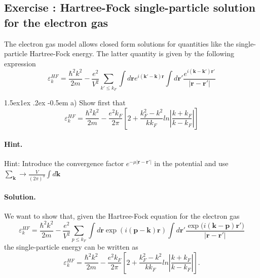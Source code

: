 \documentclass[%
oneside,                 %
final,                   %
10pt]{article}
\makeatletter
\newenvironment{doconceexercise}{}{}
\newcounter{doconceexercisecounter}
\newcommand\subex{\@startsection{paragraph}{4}{\z@}%
                  {1.5ex\@plus1ex \@minus.2ex}%
                  {-0.5em}%
                  {\normalfont\normalsize\bfseries}}
\makeatother
\begin{document}
\begin{doconceexercise}

\subsection*{Exercise \thedoconceexercisecounter: Hartree-Fock single-particle solution for the electron gas}


The electron gas model allows closed form solutions for quantities like the 
single-particle Hartree-Fock energy.  The latter quantity is given by the following expression
\[
\varepsilon_{k}^{HF}=\frac{\hbar^{2}k^{2}}{2m}-\frac{e^{2}}
{V^{2}}\sum_{k'\leq
k_{F}}\int d\mathbf{r}e^{i(\mathbf{k'}-\mathbf{k})\mathbf{r}}\int
d\mathbf{r}'\frac{e^{i(\mathbf{k}-\mathbf{k'})\mathbf{r}'}}
{\vert\mathbf{r}-\mathbf{r'}\vert}
\]


\subex{a)}
Show first that
\[
\varepsilon_{k}^{HF}=\frac{\hbar^{2}k^{2}}{2m}-\frac{e^{2}
k_{F}}{2\pi}
\left[
2+\frac{k_{F}^{2}-k^{2}}{kk_{F}}ln\left\vert\frac{k+k_{F}}
{k-k_{F}}\right\vert
\right]
\]


\paragraph{Hint.}
Hint: Introduce the convergence factor 
$e^{-\mu\vert\mathbf{r}-\mathbf{r}'\vert}$
in the potential and use  $\sum_{\mathbf{k}}\rightarrow
\frac{V}{(2\pi)^{3}}\int d\mathbf{k}$



\paragraph{Solution.}
We want to show that, given the Hartree-Fock equation for the electron gas
\[
\varepsilon_{k}^{HF}=\frac{\hbar^{2}k^{2}}{2m}-\frac{e^{2}}
{V^{2}}\sum_{p\leq
k_{F}}\int d\mathbf{r}\exp{(i(\mathbf{p}-\mathbf{k})\mathbf{r})}\int
d\mathbf{r}'\frac{\exp{(i(\mathbf{k}-\mathbf{p})\mathbf{r}'})}
{\vert\mathbf{r}-\mathbf{r'}\vert}
\]
the single-particle energy can be written as
\[
\varepsilon_{k}^{HF}=\frac{\hbar^{2}k^{2}}{2m}-\frac{e^{2}
k_{F}}{2\pi}
\left[
2+\frac{k_{F}^{2}-k^{2}}{kk_{F}}ln\left\vert\frac{k+k_{F}}
{k-k_{F}}\right\vert
\right].
\]


\end{doconceexercise}
\end{document}
